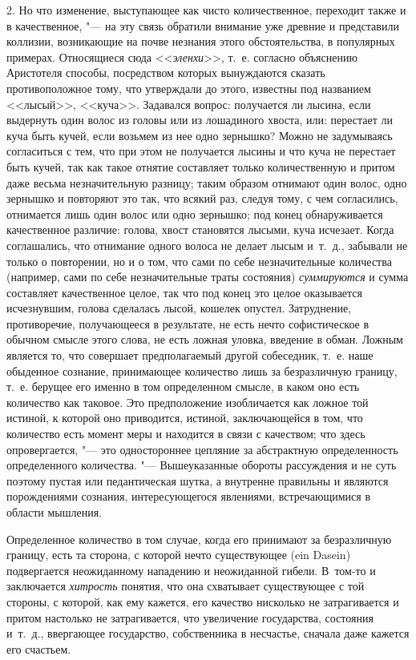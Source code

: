 2. Но что изменение, выступающее как чисто количественное, переходит также и
в качественное, "--- на эту связь обратили внимание уже древние и представили
коллизии, возникающие на почве незнания этого обстоятельства, в популярных
примерах. Относящиеся сюда <<{\em эленхи}>>, т.~е.
согласно объяснению Аристотеля способы, посредством которых вынуждаются
сказать противоположное тому, что утверждали до этого, известны под
названием <<лысый>>, <<куча>>. Задавался вопрос: получается ли лысина, если
выдернуть один волос из головы или из лошадиного хвоста, или: перестает ли
куча быть кучей, если возьмем из нее одно зернышко? Можно не задумываясь
согласиться с тем, что при этом не получается лысины и что куча не
перестает быть кучей, так как такое отнятие составляет только
количественную и притом даже весьма незначительную разницу; таким образом
отнимают один волос, одно зернышко и повторяют это так, что всякий раз,
следуя тому, с чем согласились, отнимается лишь один волос или одно
зернышко; под конец обнаруживается качественное различие: голова, хвост
становятся лысыми, куча исчезает. Когда соглашались, что отнимание одного
волоса не делает лысым и~т.~д., забывали не только о повторении, но и о
том, что сами по себе незначительные количества (например, сами по себе
незначительные траты состояния) {\em суммируются} и
сумма составляет качественное целое, так что под конец это целое
оказывается исчезнувшим, голова сделалась лысой, кошелек опустел.
Затруднение, противоречие, получающееся в результате, не есть нечто
софистическое в обычном смысле этого слова, не есть ложная уловка, введение
в обман. Ложным является то, что совершает предполагаемый другой
собеседник, т.~е. наше обыденное сознание, принимающее количество лишь за
безразличную границу, т.~е. берущее его именно в том определенном смысле, в
каком оно есть количество как таковое. Это предположение изобличается как
ложное той истиной, к которой оно приводится, истиной, заключающейся в том,
что количество есть момент меры и находится в связи с качеством; что здесь
опровергается, "--- это одностороннее цепляние за абстрактную определенность
определенного количества. "--- Вышеуказанные обороты рассуждения и не суть
поэтому пустая или педантическая шутка, а внутренне правильны и являются
порождениями сознания, интересующегося явлениями, встречающимися в области
мышления.

Определенное количество в том случае, когда его принимают за безразличную
границу, есть та сторона, с которой нечто существующее (ein Dasein)
подвергается неожиданному нападению и неожиданной гибели. В~том-то и
заключается {\em хитрость} понятия, что она схватывает
существующее с той стороны, с которой, как ему кажется, его качество
нисколько не затрагивается и притом настолько не затрагивается, что
увеличение государства, состояния и~т.~д., ввергающее государство,
собственника в несчастье, сначала даже кажется его счастьем.

